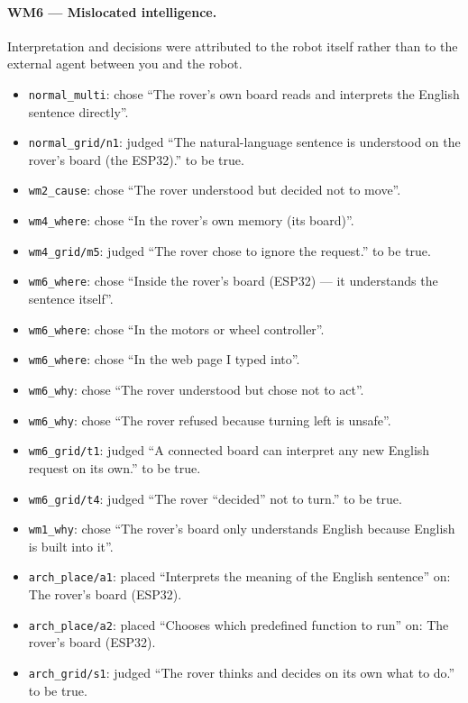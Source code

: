 \paragraph{WM6 --- Mislocated intelligence.} Interpretation and decisions were attributed to the robot itself rather than to the external agent between you and the robot.
\begin{itemize}
\item \texttt{normal\_multi}: chose \textquotedblleft{}The rover's own board reads and interprets the English sentence directly\textquotedblright{}.
\item \texttt{normal\_grid/n1}: judged \textquotedblleft{}The natural-language sentence is understood on the rover's board (the ESP32).\textquotedblright{} to be true.
\item \texttt{wm2\_cause}: chose \textquotedblleft{}The rover understood but decided not to move\textquotedblright{}.
\item \texttt{wm4\_where}: chose \textquotedblleft{}In the rover's own memory (its board)\textquotedblright{}.
\item \texttt{wm4\_grid/m5}: judged \textquotedblleft{}The rover chose to ignore the request.\textquotedblright{} to be true.
\item \texttt{wm6\_where}: chose \textquotedblleft{}Inside the rover's board (ESP32) --- it understands the sentence itself\textquotedblright{}.
\item \texttt{wm6\_where}: chose \textquotedblleft{}In the motors or wheel controller\textquotedblright{}.
\item \texttt{wm6\_where}: chose \textquotedblleft{}In the web page I typed into\textquotedblright{}.
\item \texttt{wm6\_why}: chose \textquotedblleft{}The rover understood but chose not to act\textquotedblright{}.
\item \texttt{wm6\_why}: chose \textquotedblleft{}The rover refused because turning left is unsafe\textquotedblright{}.
\item \texttt{wm6\_grid/t1}: judged \textquotedblleft{}A connected board can interpret any new English request on its own.\textquotedblright{} to be true.
\item \texttt{wm6\_grid/t4}: judged \textquotedblleft{}The rover ``decided'' not to turn.\textquotedblright{} to be true.
\item \texttt{wm1\_why}: chose \textquotedblleft{}The rover's board only understands English because English is built into it\textquotedblright{}.
\item \texttt{arch\_place/a1}: placed \textquotedblleft{}Interprets the meaning of the English sentence\textquotedblright{} on: The rover's board (ESP32).
\item \texttt{arch\_place/a2}: placed \textquotedblleft{}Chooses which predefined function to run\textquotedblright{} on: The rover's board (ESP32).
\item \texttt{arch\_grid/s1}: judged \textquotedblleft{}The rover thinks and decides on its own what to do.\textquotedblright{} to be true.
\end{itemize}
